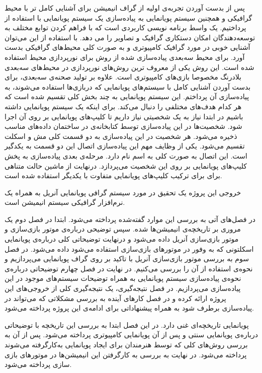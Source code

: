 پس از بدست آوردن تجربه‌ی اولیه از گراف انیمیشن برای آشنایی کامل تر 
با محیط گرافیکی و همچنین سیستم پویانمایی به پیاده‌سازی یک سیستم پویانمایی با استفاده از 
پرداختیم.
یک واسط برنامه نویسی کاربردی
است که با فراهم کردن توابع مختلف به توسعه‌دهندگان امکان دستکاری گرافیک و تصاویر را می ‌دهد.
با استفاده از این 
می‌توان آشنایی خوبی در مورد گرافیک کامپیوتری و به صورت کلی محیط‌های گرافیکی بدست آورد.
برای محیط سه‌بعدی پیاده‌سازی شده از روش 
برای نورپردازی محیط استفاده شده است. این روش یکی از معروف ترین روش‌های نورپردازی در محیط‌های سه‌بعدی بلادرنگ مخصوصا بازی‌های کامپیوتری است. علاوه بر تولید صحنه‌ی سه‌بعدی،
برای بدست آوردن آشنایی کامل با سیستم‌های پویانمایی که دربازی‌ها استفاده می‌شوند، به پیاده‌سازی آن پرداختم.
این سیستم پویانمایی به چند بخش کلی تقسیم شده است که هر کدام هدف‌های مختلفی را دنبال می‌کند.
برای اینکه یک سیستم پویانمایی داشته باشیم در ابتدا نیاز به یک شخصیتی نیاز داریم 
تا کلیپ‌های پویانمایی بر روی آن اجرا شود.
شخصیت‌ها در این پیاده‌سازی توسط کتابخانه‌ی 
در ساختمان داده‌های مناسب ذخیره می‌شود.
هر شخصیت در این پیاده‌سازی به دو قسمت کلی مش و اسکلت تقسیم می‌شود.
یکی از وظایف مهم این پیاده‌سازی اتصال این دو قسمت به یکدگیر 
است.
این اتصال به صورت کلی به اسم 
نام دارد. 
مرحله‌ی بعدی پیاده‌سازی به پخش کلیپ‌های پویانمایی بر روی این شخصیت می‌پردازد.
درنهایت از ماشین حالت متناهی برای برای ترکیب کلیپ‌های پویانمایی متفاوت با یکدیگر استفاده شده است.

خروجی این پروژه یک تحقیق در مورد سیستم گرافی پویانمایی آنریل به همراه 
یک نرم‌افزار گرافیکی سیستم انیمیشن است.

در فصل‌های آتی به بررسی این موارد گفته‌شده پرداخته می‌شود.
ابتدا در فصل دوم یک مروری بر تاریخچه‌ی انیمیشن‌ها شده. سپس توضیحی درباره‌ی موتور بازی‌سازی و 
موتور بازی‌سازی آنریل داده می‌شود و درنهایت توضیحاتی کلی 
درباره‌ی پویانمایی اسکلتونی که به وفور در موتور‌های بازی‌سازی استفاده می‌شود داده می‌شود.
در فصل سوم به بررسی موتور بازی‌سازی آنریل با تاکید بر روی گراف پویانمایی می‌پردازیم و نحوه‌ی استفاده از آن را بررسی می‌کنیم.
در نهایت در فصل چهارم توضیحاتی درباره‌ی نحوه‌ی پیاده‌سازی سیستم پویانمایی
به همراه توضیحات سیستم‌های موجود در این پیاده‌سازی می‌پردازیم.
در فصل نتیجه‌گیری، یک نتیجه‌گیری کلی از خروجی‌های این پروژه ارائه کرده 
و در فصل کارهای آینده به بررسی مشکلاتی که می‌تواند در پیاده‌سازی برطرف شود به همراه 
پیشنهاداتی برای ادامه‌ی این پروژه پرداخته می‌شود.



پویانمایی تاریخچه‌ای غنی‌ دارد. در این فصل ابتدا به بررسی این تاریخچه با توضیحاتی 
درباره‌ی پویانمایی سنتی و پس از آن پویانمایی کامپیوتری پرداخته می‌شود.
پس از آن به بررسی روش‌های کلی که توسط هنرمندان برای ایجاد پویانمایی به‌کارگرفته می‌شوند پرداخته می‌شود.
در نهایت به بررسی به کارگرفتن این انیمیشن‌ها در موتورهای بازی سازی پرداخته می‌شود.

